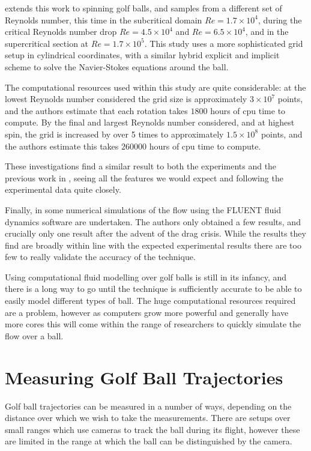\citet{Beratlis2012Numerical} extends this work to spinning golf balls, and samples from a different
set of Reynolds number, this time in the subcritical domain $Re = 1.7\times10^4$, during the critical
Reynolds number drop $Re = 4.5\times10^4$ and $Re = 6.5\times10^4$, and in the supercritical section
at $Re = 1.7\times10^5$. This study uses a more sophisticated grid setup in cylindrical coordinates,
with a similar hybrid explicit and implicit scheme to solve the Navier-Stokes equations around the ball.

The computational resources used within this study are quite considerable: at the lowest Reynolds 
number considered the grid size is approximately $3\times10^7$ points, and the authors estimate that each rotation
takes $1800$ hours of cpu time to compute. By the final and largest Reynolds number considered, and at 
highest spin, the grid is increased by over 5 times to approximately $1.5\times10^8$ points, 
and the authors estimate this
takes $260000$ hours of cpu time to compute.

These investigations find a similar result to both the experiments and the previous work in \citet{Smith2010},
seeing all the features we would expect and following the experimental data quite closely.

Finally, in \citet{Aoki2010} some numerical simulations of the flow using the FLUENT fluid dynamics
software are undertaken. The authors only obtained a few results, and crucially only one result after
the advent of the drag crisis. While the results they find are broadly within line with the expected
experimental results there are too few to really validate the accuracy of the technique.

Using computational fluid modelling over golf balls is still in its infancy, and there is a long way
to go until the technique is sufficiently accurate to be able to easily model different types of ball.
The huge computational resources required are a problem, however as computers grow more powerful and
generally have more cores this will come within the range of researchers to quickly simulate the flow
over a ball.

\section{Measuring Golf Ball Trajectories}

Golf ball trajectories can be measured in a number of ways, depending on the distance over which we
wish to take the measurements. There are setups over small ranges which use cameras to track the ball
during its flight, however these are limited in the range at which the ball can be distinguished by
the camera.

